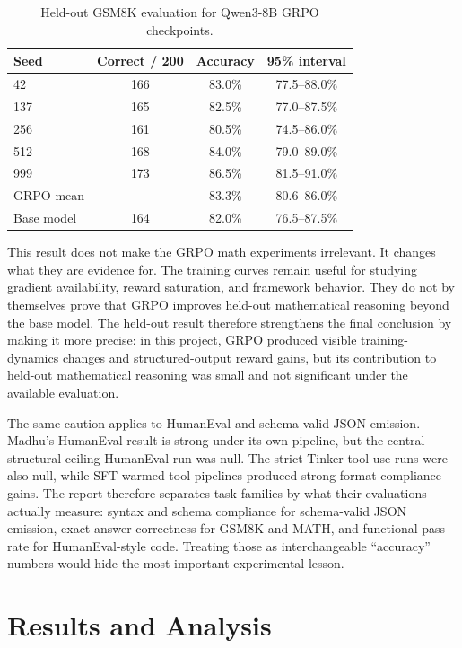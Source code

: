 \documentclass[12pt,a4paper]{report}
\begin{document}
\begin{table}[ht]
\centering
\caption{Held-out GSM8K evaluation for Qwen3-8B GRPO checkpoints.}
\label{tab:heldout-gsm8k}
\begin{tabular}{lccc}
\toprule
Seed & Correct / 200 & Accuracy & 95\% interval\\
\midrule
42 & 166 & 83.0\% & 77.5--88.0\%\\
137 & 165 & 82.5\% & 77.0--87.5\%\\
256 & 161 & 80.5\% & 74.5--86.0\%\\
512 & 168 & 84.0\% & 79.0--89.0\%\\
999 & 173 & 86.5\% & 81.5--91.0\%\\
\midrule
GRPO mean & --- & 83.3\% & 80.6--86.0\%\\
Base model & 164 & 82.0\% & 76.5--87.5\%\\
\bottomrule
\end{tabular}
\end{table}

This result does not make the GRPO math experiments irrelevant. It changes what they are evidence for. The training curves remain useful for studying gradient availability, reward saturation, and framework behavior. They do not by themselves prove that GRPO improves held-out mathematical reasoning beyond the base model. The held-out result therefore strengthens the final conclusion by making it more precise: in this project, GRPO produced visible training-dynamics changes and structured-output reward gains, but its contribution to held-out mathematical reasoning was small and not significant under the available evaluation.

The same caution applies to HumanEval and schema-valid JSON emission. Madhu's HumanEval result is strong under its own pipeline, but the central structural-ceiling HumanEval run was null. The strict Tinker tool-use runs were also null, while SFT-warmed tool pipelines produced strong format-compliance gains. The report therefore separates task families by what their evaluations actually measure: syntax and schema compliance for schema-valid JSON emission, exact-answer correctness for GSM8K and MATH, and functional pass rate for HumanEval-style code. Treating those as interchangeable ``accuracy'' numbers would hide the most important experimental lesson.

\chapter{Results and Analysis}
\end{document}
